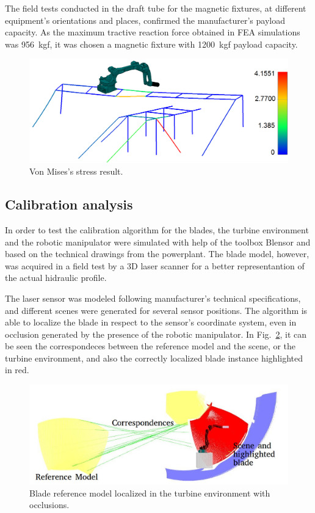 The field tests conducted in the draft tube for the magnetic fixtures, at
different equipment's orientations and places, confirmed the manufacturer's
payload capacity. As the maximum tractive reaction force obtained in FEA
simulations was 956~kgf, it was chosen a magnetic fixture with 1200~kgf
payload capacity.

\begin{figure}
	\centering
	\includegraphics[width=.95\columnwidth]{figs/mecanica/von_mises.png}
    \caption{Von Mises's stress result.}
    \label{fig:von_mises}
\end{figure}

\subsection{Calibration analysis}

In order to test the calibration algorithm for the blades, the turbine
environment and the robotic manipulator were simulated with help of the toolbox
Blensor \cite{Gschwandtner11b} and based on the technical drawings from the
powerplant. The blade model, however, was acquired in a field test by a 3D laser
scanner for a better representantion of the actual hidraulic profile.

The laser sensor was modeled following manufacturer's technical
specifications, and different scenes were generated for several sensor
positions. The algorithm is able to localize the blade in respect to the
sensor's coordinate system, even in occlusion generated by the presence of the
robotic manipulator. In Fig.~\ref{fig:calibration}, it can be seen the
correspondeces between the reference model and the scene, or the turbine
environment, and also the correctly localized blade instance highlighted in red.

\begin{figure}
	\centering
	\includegraphics[width=.95\columnwidth]{figs/results/sim_mh12_sp}
    \caption{Blade reference model localized in the turbine environment with
    occlusions.}
    \label{fig:calibration}
\end{figure}

